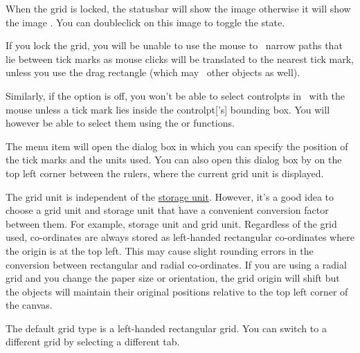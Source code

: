 When the grid is locked, the \gls{statusbar} will show the image
 otherwise it will show
the image .
You can \gls{doubleclick} on this image to toggle the state.

\begin{warning}
If you lock the grid, you will be unable to use the
mouse to \select\ narrow \glspl{path} that lie between tick marks as
mouse \glspl{click} will be translated to the nearest tick mark, unless you
use the drag rectangle (which may \select\ other \glspl{object} as well).
\end{warning}

Similarly, if the 
option is off, you won't be able to select \glspl{controlpt} in
\editpathmode\ with the mouse unless a
tick mark lies inside the \gls{controlpt}['s] bounding box.
You will however be able to select them using the
or  functions.


The  menu item will open the
 dialog box in which you can specify the position of the tick marks
and the units used. You can also open this dialog box by
 on the top left corner
between the \glspl{ruler}, where the current grid unit is displayed.

\begin{important}
The grid unit is independent of the 
\hyperref[sec:controlsettings]{storage unit}.  However, it's a good idea to choose a
grid unit and storage unit that have a convenient conversion factor
between them. For example,  storage unit and 
grid unit. Regardless of the grid used, co-ordinates are always
stored as left-handed rectangular co-ordinates where the origin is
at the top left. This may cause slight rounding errors in the
conversion between rectangular and radial co-ordinates. If you are
using a radial grid and you change the paper size or orientation,
the grid origin will shift but the \glspl{object} will maintain
their original positions relative to the top left corner of the
\gls{canvas}.
\end{important}


The default grid type is a left-handed rectangular grid. You can
switch to a different grid by selecting a different tab.

